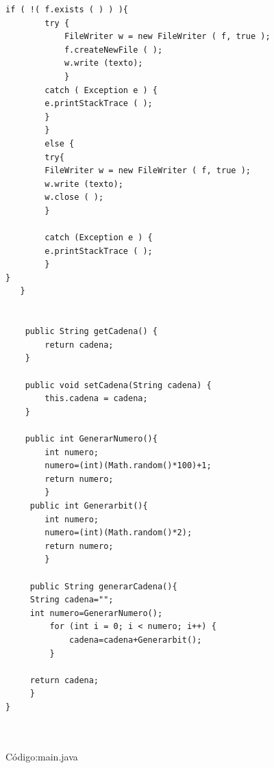\begin{lstlisting}[frame=single]
        if ( !( f.exists ( ) ) ){
        try {
            FileWriter w = new FileWriter ( f, true );
            f.createNewFile ( );
            w.write (texto);
            } 
        catch ( Exception e ) {
        e.printStackTrace ( );
        }
        } 
        else {
        try{
        FileWriter w = new FileWriter ( f, true );
        w.write (texto);
        w.close ( );
        } 
        
        catch (Exception e ) {
        e.printStackTrace ( );
        }
}
   }
   

    public String getCadena() {
        return cadena;
    }

    public void setCadena(String cadena) {
        this.cadena = cadena;
    }
    
    public int GenerarNumero(){
        int numero;
        numero=(int)(Math.random()*100)+1;
        return numero;
        }
     public int Generarbit(){
        int numero;
        numero=(int)(Math.random()*2);
        return numero;
        }
   
     public String generarCadena(){
     String cadena="";
     int numero=GenerarNumero();
         for (int i = 0; i < numero; i++) {
             cadena=cadena+Generarbit();
         }
     
     return cadena;
     }
}



\end{lstlisting}
\vspace{1.5cm}
C\'odigo:main.java

